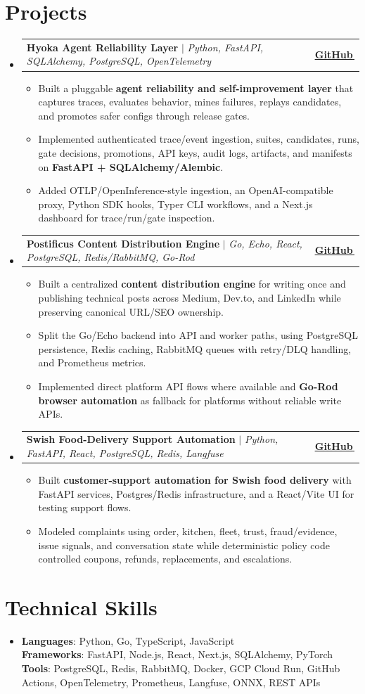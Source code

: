 \documentclass[letterpaper,11pt]{article}
\makeatletter
\newcommand{\bodyhref}[2]{\href{#1}{\underline{#2}\,\faExternalLink*}}
\newcommand{\resumeItem}[1]{\item{\fontsize{8.82pt}{9.28pt}\selectfont #1\vspace{-0.7pt}}}
\newcommand{\resumeProjectHeading}[2]{
    \item
    \begin{tabular*}{1.0\textwidth}{l@{\extracolsep{\fill}}r}
      \small#1 & \textbf{\small #2}\\
    \end{tabular*}\vspace{-4pt}
}
\newcommand{\resumeSubHeadingListStart}{\begin{itemize}[leftmargin=0.0in, label={}, itemsep=0.6pt, topsep=0pt, parsep=0pt, partopsep=0pt]}
\newcommand{\resumeSubHeadingListEnd}{\end{itemize}}
\newcommand{\resumeItemListStart}{\begin{itemize}[leftmargin=0.16in,itemsep=0.3pt,topsep=0.9pt,parsep=0pt,partopsep=0pt]}
\newcommand{\resumeItemListEnd}{\end{itemize}\vspace{-3pt}}
\makeatother
\begin{document}
\section{Projects}
\resumeSubHeadingListStart
\resumeProjectHeading
{\textbf{Hyoka Agent Reliability Layer} $|$ \emph{Python, FastAPI, SQLAlchemy, PostgreSQL, OpenTelemetry}}{\bodyhref{https://github.com/unichronic/hyoka}{GitHub}}
\resumeItemListStart
\resumeItem{Built a pluggable \textbf{agent reliability and self-improvement layer} that captures traces, evaluates behavior, mines failures, replays candidates, and promotes safer configs through release gates.}
\resumeItem{Implemented authenticated trace/event ingestion, suites, candidates, runs, gate decisions, promotions, API keys, audit logs, artifacts, and manifests on \textbf{FastAPI + SQLAlchemy/Alembic}.}
\resumeItem{Added OTLP/OpenInference-style ingestion, an OpenAI-compatible proxy, Python SDK hooks, Typer CLI workflows, and a Next.js dashboard for trace/run/gate inspection.}
\resumeItemListEnd
\resumeProjectHeading
{\textbf{Postificus Content Distribution Engine} $|$ \emph{Go, Echo, React, PostgreSQL, Redis/RabbitMQ, Go-Rod}}{\bodyhref{https://github.com/unichronic/postificus}{GitHub}}
\resumeItemListStart
\resumeItem{Built a centralized \textbf{content distribution engine} for writing once and publishing technical posts across Medium, Dev.to, and LinkedIn while preserving canonical URL/SEO ownership.}
\resumeItem{Split the Go/Echo backend into API and worker paths, using PostgreSQL persistence, Redis caching, RabbitMQ queues with retry/DLQ handling, and Prometheus metrics.}
\resumeItem{Implemented direct platform API flows where available and \textbf{Go-Rod browser automation} as fallback for platforms without reliable write APIs.}
\resumeItemListEnd
\resumeProjectHeading
{\textbf{Swish Food-Delivery Support Automation} $|$ \emph{Python, FastAPI, React, PostgreSQL, Redis, Langfuse}}{\bodyhref{https://github.com/unichronic/swishagent}{GitHub}}
\resumeItemListStart
\resumeItem{Built \textbf{customer-support automation for Swish food delivery} with FastAPI services, Postgres/Redis infrastructure, and a React/Vite UI for testing support flows.}
\resumeItem{Modeled complaints using order, kitchen, fleet, trust, fraud/evidence, issue signals, and conversation state while deterministic policy code controlled coupons, refunds, replacements, and escalations.}
\resumeItemListEnd
\resumeSubHeadingListEnd

\section{Technical Skills}
\begin{itemize}[leftmargin=0.15in, label={}, topsep=0pt, itemsep=0pt, parsep=0pt, partopsep=0pt]
  \item{\fontsize{9.0pt}{9.25pt}\selectfont
   \textbf{Languages}{: Python, Go, TypeScript, JavaScript} \\
   \textbf{Frameworks}{: FastAPI, Node.js, React, Next.js, SQLAlchemy, PyTorch} \\
   \textbf{Tools}{: PostgreSQL, Redis, RabbitMQ, Docker, GCP Cloud Run, GitHub Actions, OpenTelemetry, Prometheus, Langfuse, ONNX, REST APIs} \\
  }
\end{itemize}
\end{document}
